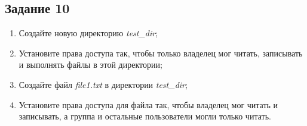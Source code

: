 \documentclass[12pt, a4paper]{report}
\begin{document}
	\subsection*{Задание 10}
	\begin{enumerate}
		\item Создайте новую директорию \textit{test\_dir};
		\item Установите права доступа так, чтобы только владелец мог читать, записывать и выполнять файлы в этой директории;
		\item Создайте файл \textit{file1.txt} в директории \textit{test\_dir};
		\item Установите права доступа для файла так, чтобы владелец мог читать и записывать, а группа и остальные пользователи могли только читать.
	\end{enumerate}
	\lstset{style=mystyle}
	
\end{document}
